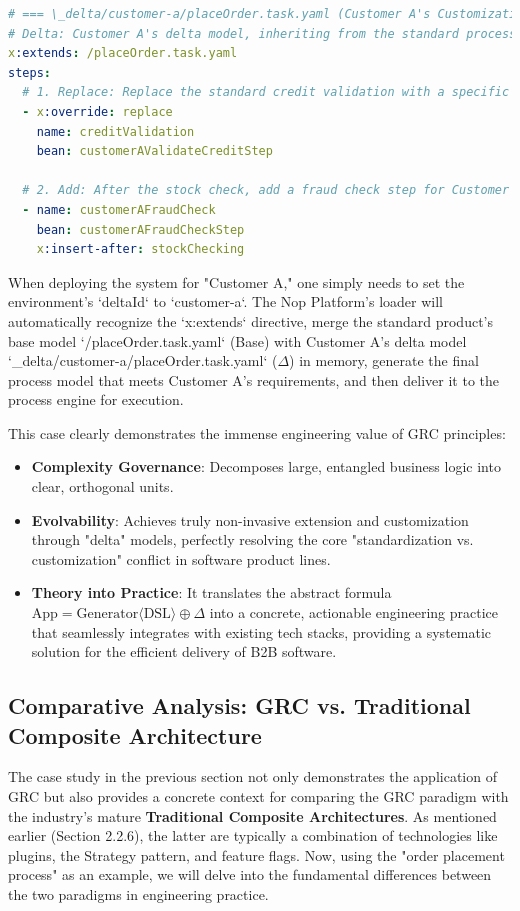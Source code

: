 \documentclass[11pt]{article}
\begin{document}
\begin{lstlisting}[language=YAML, caption={Customization Delta Model for Customer A}]
# === \_delta/customer-a/placeOrder.task.yaml (Customer A's Customization) ===
# Delta: Customer A's delta model, inheriting from the standard process
x:extends: /placeOrder.task.yaml
steps:
  # 1. Replace: Replace the standard credit validation with a specific version
  - x:override: replace
    name: creditValidation
    bean: customerAValidateCreditStep

  # 2. Add: After the stock check, add a fraud check step for Customer A
  - name: customerAFraudCheck
    bean: customerAFraudCheckStep
    x:insert-after: stockChecking
\end{lstlisting}
When deploying the system for "Customer A," one simply needs to set the environment's `deltaId` to `customer-a`. The Nop Platform's loader will automatically recognize the `x:extends` directive, merge the standard product's base model `/placeOrder.task.yaml` (Base) with Customer A's delta model `\_delta/customer-a/placeOrder.task.yaml` ($\Delta$) in memory, generate the final process model that meets Customer A's requirements, and then deliver it to the process engine for execution.

This case clearly demonstrates the immense engineering value of GRC principles:
\begin{itemize}
    \item \textbf{Complexity Governance}: Decomposes large, entangled business logic into clear, orthogonal units.
    \item \textbf{Evolvability}: Achieves truly non-invasive extension and customization through "delta" models, perfectly resolving the core "standardization vs. customization" conflict in software product lines.
    \item \textbf{Theory into Practice}: It translates the abstract formula $\text{App} = \text{Generator}\langle\text{DSL}\rangle \oplus \Delta$ into a concrete, actionable engineering practice that seamlessly integrates with existing tech stacks, providing a systematic solution for the efficient delivery of B2B software.
\end{itemize}

\subsection{Comparative Analysis: GRC vs. Traditional Composite Architecture}

The case study in the previous section not only demonstrates the application of GRC but also provides a concrete context for comparing the GRC paradigm with the industry's mature \textbf{Traditional Composite Architectures}. As mentioned earlier (Section 2.2.6), the latter are typically a combination of technologies like plugins, the Strategy pattern, and feature flags. Now, using the "order placement process" as an example, we will delve into the fundamental differences between the two paradigms in engineering practice.
\end{document}
